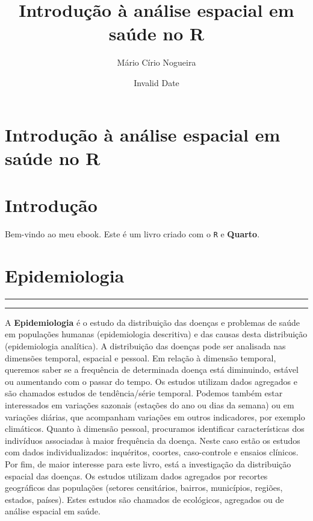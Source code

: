 \documentclass[
  letterpaper,
  DIV=11,
  numbers=noendperiod]{scrreprt}
\title{Introdução à análise espacial em saúde no R}
\author{Mário Círio Nogueira}
\date{Invalid Date}
\renewcommand*\contentsname{Table of contents}
\newcommand\contentsname{Table of contents}
\begin{document}
\maketitle

\renewcommand*\contentsname{Table of contents}
{
\hypersetup{linkcolor=}
\setcounter{tocdepth}{2}
\tableofcontents
}

\chapter{Introdução à análise espacial em saúde no
R}\label{introduuxe7uxe3o-uxe0-anuxe1lise-espacial-em-sauxfade-no-r}


\chapter{Introdução}\label{introduuxe7uxe3o}

Bem-vindo ao meu ebook. Este é um livro criado com o \texttt{R} e
\textbf{Quarto}.


\chapter{Epidemiologia}\label{epidemiologia}

\begin{center}\rule{0.5\linewidth}{0.5pt}\end{center}

\begin{center}\rule{0.5\linewidth}{0.5pt}\end{center}

A \textbf{Epidemiologia} é o estudo da distribuição das doenças e
problemas de saúde em populações humanas (epidemiologia descritiva) e
das causas desta distribuição (epidemiologia analítica). A distribuição
das doenças pode ser analisada nas dimensões temporal, espacial e
pessoal. Em relação à dimensão temporal, queremos saber se a frequência
de determinada doença está diminuindo, estável ou aumentando com o
passar do tempo. Os estudos utilizam dados agregados e são chamados
estudos de tendência/série temporal. Podemos também estar interessados
em variações sazonais (estações do ano ou dias da semana) ou em
variações diárias, que acompanham variações em outros indicadores, por
exemplo climáticos. Quanto à dimensão pessoal, procuramos identificar
características dos indivíduos associadas à maior frequência da doença.
Neste caso estão os estudos com dados individualizados: inquéritos,
coortes, caso-controle e ensaios clínicos. Por fim, de maior interesse
para este livro, está a investigação da distribuição espacial das
doenças. Os estudos utilizam dados agregados por recortes geográficos
das populações (setores censitários, bairros, municípios, regiões,
estados, países). Estes estudos são chamados de ecológicos, agregados ou
de análise espacial em saúde.
\end{document}
